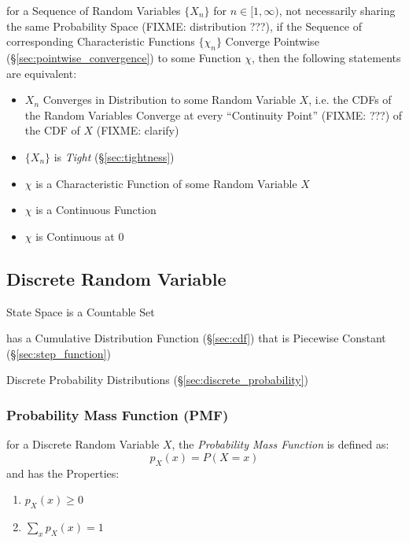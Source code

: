 for a Sequence of Random Variables $\{ X_n \}$ for $n \in [1, \infty)$, not
necessarily sharing the same Probability Space (FIXME: distribution ???), if the
Sequence of corresponding Characteristic Functions $\{ \chi_n \}$ Converge
Pointwise (\S\ref{sec:pointwise_convergence}) to some Function $\chi$, then the
following statements are equivalent:

\begin{itemize}
  \item $X_n$ Converges in Distribution to some Random Variable $X$, i.e. the
    CDFs of the Random Variables Converge at every ``Continuity Point'' (FIXME:
    ???) of the CDF of $X$ (FIXME: clarify)
  \item $\{ X_n \}$ is \emph{Tight} (\S\ref{sec:tightness})
  \item $\chi$ is a Characteristic Function of some Random Variable $X$
  \item $\chi$ is a Continuous Function
  \item $\chi$ is Continuous at $0$
\end{itemize}



\subsection{Discrete Random Variable}\label{sec:discrete_random_variable}

State Space is a Countable Set

has a Cumulative Distribution Function (\S\ref{sec:cdf}) that is Piecewise
Constant (\S\ref{sec:step_function})

\fist Discrete Probability Distributions (\S\ref{sec:discrete_probability})



\subsubsection{Probability Mass Function (PMF)}\label{sec:pmf}

for a Discrete Random Variable $X$, the \emph{Probability Mass Function} is
defined as:
\[
  p_X(x) = P(X = x)
\]
and has the Properties:
\begin{enumerate}
  \item $p_X(x) \geq 0$
  \item $\sum_x p_X(x) = 1$
\end{enumerate}


